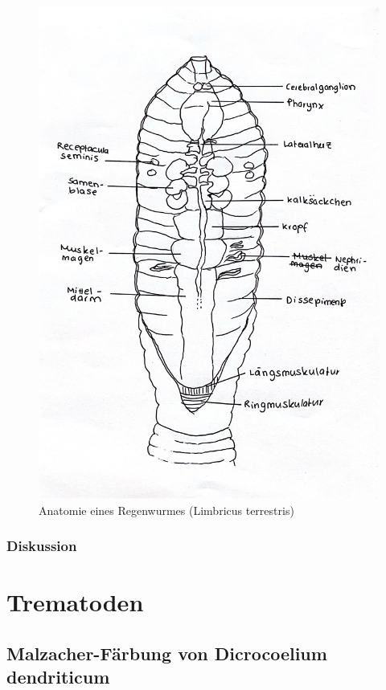\documentclass[oneside,10pt,a4paper]{report}
\begin{document}
				\begin{figure}[H]
					\centering
					\includegraphics[scale=0.25]{Regenwurm.JPG}
					\caption{Anatomie eines Regenwurmes (Limbricus terrestris)}
					\label{fig:Regenwurm_ana}
				\end{figure}
			
			\subsection{Diskussion}
			
	
	
	\chapter{Trematoden}
		\section{Malzacher-Färbung von Dicrocoelium dendriticum}
\end{document}
